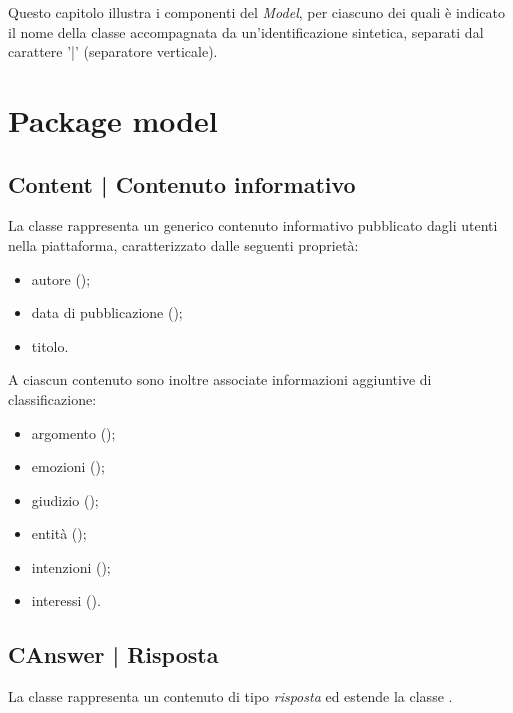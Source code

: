 \documentclass[10pt,a4paper,headinclude,footinclude,hidelinks]{scrreprt} %
\begin{document}
	Questo capitolo illustra i componenti del \textit{Model}, per ciascuno dei quali è indicato il nome della classe accompagnata da un'identificazione sintetica, separati dal carattere '|' (separatore verticale).

	\section{Package model}
	\label{sec:stage:design:sistema:model}

	\subsection[Content]{Content | Contenuto informativo}
	\label{sec:stage:design:sistema:model:content}
	La classe rappresenta un generico contenuto informativo pubblicato dagli utenti nella piattaforma, caratterizzato dalle seguenti proprietà:
	\begin{itemize}
	\item autore (\textit{});
	\item data di pubblicazione (\textit{});
	\item titolo.
	\end{itemize}

	A ciascun contenuto sono inoltre associate informazioni aggiuntive di classificazione:
	\begin{itemize}
	\item argomento (\textit{});
	\item emozioni (\textit{});
	\item giudizio (\textit{});
	\item entità (\textit{});
	\item intenzioni (\textit{});
	\item interessi (\textit{}).
	\end{itemize}

	\subsection[CAnswer]{CAnswer | Risposta}
	\label{sec:stage:design:sistema:model:answer}
	La classe rappresenta un contenuto di tipo \textit{risposta} ed estende la classe \textit{}.
\end{document}
